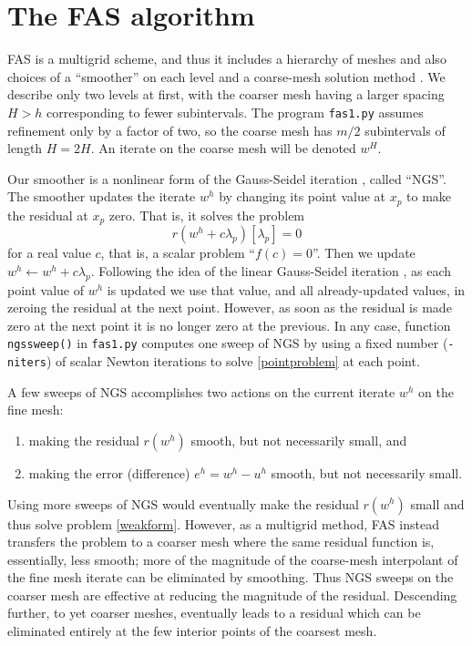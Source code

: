 \documentclass[letterpaper,final,12pt,reqno]{amsart}
\begin{document}
\section{The FAS algorithm}

FAS is a multigrid scheme, and thus it includes a hierarchy of meshes and also choices of a ``smoother'' on each level and a coarse-mesh solution method \cite{Briggsetal2000}.  We describe only two levels at first, with the coarser mesh having a larger spacing $H>h$ corresponding to fewer subintervals.  The program \texttt{fas1.py} assumes refinement only by a factor of two, so the coarse mesh has $m/2$ subintervals of length $H=2H$.  An iterate on the coarse mesh will be denoted $w^H$.

Our smoother is a nonlinear form of the Gauss-Seidel iteration \cite{Briggsetal2000}, called ``NGS''.  The smoother updates the iterate $w^h$ by changing its point value at $x_p$ to make the residual at $x_p$ zero.  That is, it solves the problem
\begin{equation}
r(w^h + c \lambda_p)[\lambda_p] = 0  \label{pointproblem}
\end{equation}
for a real value $c$, that is, a scalar problem ``$f(c)=0$''.  Then we update $w^h \longleftarrow w^h + c \lambda_p$.  Following the idea of the linear Gauss-Seidel iteration \cite{Bueler2021}, as each point value of $w^h$ is updated we use that value, and all already-updated values, in zeroing the residual at the next point.  However, as soon as the residual is made zero at the next point it is no longer zero at the previous.  In any case, function \texttt{ngssweep()} in \texttt{fas1.py} computes one sweep of NGS by using a fixed number (\texttt{-niters}) of scalar Newton iterations to solve \eqref{pointproblem} at each point.

A few sweeps of NGS accomplishes two actions on the current iterate $w^h$ on the fine mesh:
\renewcommand{\labelenumi}{\emph{\roman{enumi})}}
\begin{enumerate}
\item making the residual $r(w^h)$ smooth, but not necessarily small, and
\item making the error (difference) $e^h = w^h - u^h$ smooth, but not necessarily small.
\end{enumerate}
Using more sweeps of NGS would eventually make the residual $r(w^h)$ small and thus solve problem \eqref{weakform}.  However, as a multigrid method, FAS instead transfers the problem to a coarser mesh where the same residual function is, essentially, less smooth; more of the magnitude of the coarse-mesh interpolant of the fine mesh iterate can be eliminated by smoothing.  Thus NGS sweeps on the coarser mesh are effective at reducing the magnitude of the residual.  Descending further, to yet coarser meshes, eventually leads to a residual which can be eliminated entirely at the few interior points of the coarsest mesh.
\end{document}
